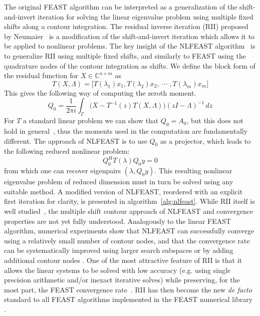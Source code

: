 \documentclass[onefignum,onetabnum]{siamart190516}
\begin{document}
The original FEAST algorithm \cite{polizzi2009,tang2014} can be interpreted as a generalization of the shift-and-invert iteration for solving the linear eigenvalue problem using multiple fixed shifts along a contour integration.
The residual inverse iteration (RII)  proposed by Neumaier~\cite{neumaier1985}  is a modification of the shift-and-invert iteration which allows it to be applied to nonlinear problems.
The key insight of the NLFEAST algorithm~\cite{gavin2018,gavin2018a} is to generalize RII using multiple fixed shifts, and similarly to FEAST using the quadrature nodes of the contour integration as shifts.
We define the block form of the residual function for \( X \in \mathbb{C}^{n \times m} \) as
\begin{equation}
	T(X, \Lambda) = \big[ T(\lambda_1)x_1, T(\lambda_2)x_2, \; \cdots \;, T(\lambda_m)x_m \big]
\end{equation}
This gives the following way of computing the zeroth moment.
\begin{equation}\label{eq:nlfeast_contour}
	Q_0 = \frac{1}{2 \pi i} \int_{\Gamma} \big( X - T^{-1}(z)T(X, \Lambda)\big) {(zI - \Lambda)}^{-1} \, dz
\end{equation}
For \( T \) a standard linear problem we can show that \( Q_0 = A_0 \), but this does not hold in general~\cite{neumaier1985}, thus the moments used in the computation are fundamentally different.
The approach of NLFEAST is to use \( Q_0 \) as a projector, which leads to the following reduced nonlinear problem:
\begin{equation}\label{eq:red}
	Q_0^H T(\lambda) Q_0 y = 0	
\end{equation}
from which one can recover eigenpairs \( (\lambda, Q_0 y) \).
This resulting nonlinear eigenvalue problem of reduced dimension must in turn be solved using any suitable method.
A modified version of NLFEAST, reordered with an explicit first iteration for clarity, is presented in algorithm~\ref{alg:nlfeast}.
While RII itself is well studied~\cite{jarlebring2011}, the multiple shift contour approach of NLFEAST and convergence properties are not yet fully understood.
Analogously to the linear FEAST algorithm, numerical experiments show that NLFEAST can successfully converge using a relatively small number of contour nodes, and that the convergence rate can be systematically improved using larger search subspaces or by adding additional contour nodes \cite{gavin2018}.
One of the most attractive feature of RII is that it allows the linear systems to be solved with low accuracy
(e.g. using single precision arithmetic and/or inexact iterative solves) while preserving, for the most part, the FEAST convergence rate~\cite{gavin2018a,golub2000a}.
RII has then become the new {\em de facto} standard to all FEAST algorithms implemented in the FEAST numerical library \cite{polizzi2020}.
\end{document}
